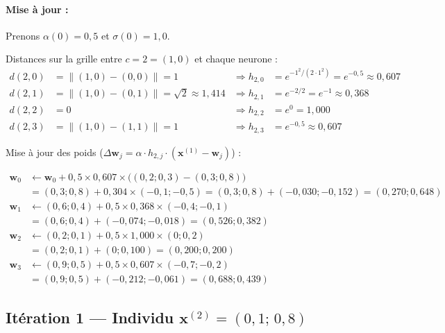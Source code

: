 \documentclass[a4paper,11pt]{article}
\theoremstyle{definition}
\begin{document}
\paragraph{Mise à jour :}
Prenons $\alpha(0) = 0{,}5$ et $\sigma(0) = 1{,}0$.

Distances sur la grille entre $c=2=(1,0)$ et chaque neurone :
\begin{align*}
d(2,0) &= \|(1,0)-(0,0)\| = 1 &\Rightarrow h_{2,0} &= e^{-1^2/(2\cdot1^2)} = e^{-0,5} \approx 0{,}607 \\
d(2,1) &= \|(1,0)-(0,1)\| = \sqrt{2} \approx 1{,}414 &\Rightarrow h_{2,1} &= e^{-2/2} = e^{-1} \approx 0{,}368 \\
d(2,2) &= 0 &\Rightarrow h_{2,2} &= e^{0} = 1{,}000 \\
d(2,3) &= \|(1,0)-(1,1)\| = 1 &\Rightarrow h_{2,3} &= e^{-0,5} \approx 0{,}607
\end{align*}

Mise à jour des poids ($\Delta\mathbf{w}_j = \alpha \cdot h_{2,j} \cdot (\mathbf{x}^{(1)} - \mathbf{w}_j)$) :

\begin{align*}
\mathbf{w}_0 &\leftarrow \mathbf{w}_0 + 0{,}5 \times 0{,}607 \times \bigl((0{,}2;0{,}3) - (0{,}3;0{,}8)\bigr) \\
&= (0{,}3;0{,}8) + 0{,}304 \times (-0{,}1;-0{,}5) = (0{,}3;0{,}8) + (-0{,}030;-0{,}152) = (0{,}270;0{,}648) \\[0,3cm]
\mathbf{w}_1 &\leftarrow (0{,}6;0{,}4) + 0{,}5 \times 0{,}368 \times (-0{,}4;-0{,}1) \\
&= (0{,}6;0{,}4) + (-0{,}074;-0{,}018) = (0{,}526;0{,}382) \\[0,3cm]
\mathbf{w}_2 &\leftarrow (0{,}2;0{,}1) + 0{,}5 \times 1{,}000 \times (0;0{,}2) \\
&= (0{,}2;0{,}1) + (0;0{,}100) = (0{,}200;0{,}200) \\[0,3cm]
\mathbf{w}_3 &\leftarrow (0{,}9;0{,}5) + 0{,}5 \times 0{,}607 \times (-0{,}7;-0{,}2) \\
&= (0{,}9;0{,}5) + (-0{,}212;-0{,}061) = (0{,}688;0{,}439)
\end{align*}

\subsection{Itération 1 — Individu $\mathbf{x}^{(2)} = (0{,}1;\,0{,}8)$}
\end{document}
